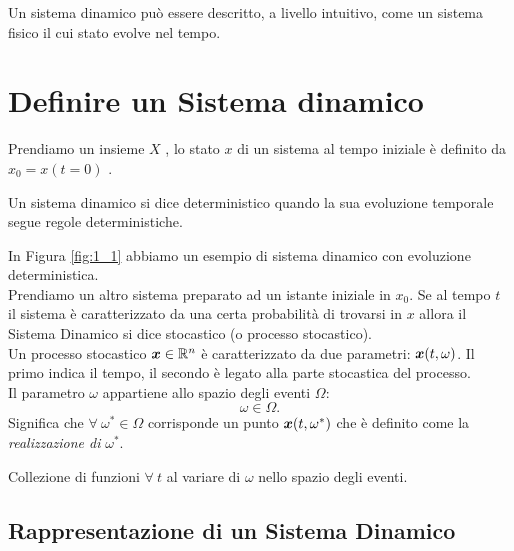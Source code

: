Un sistema dinamico può essere descritto, a livello intuitivo, come un sistema fisico il cui stato evolve nel tempo.
\section{Definire un Sistema dinamico}%
\label{sub:Sistema dinamico Deterministico e Stocastico.}
Prendiamo un insieme $X$ 
, lo stato $x$ di un sistema al tempo iniziale è definito da $x_0 = x(t=0)$
\leavevmode{}.
\begin{defn}
    Un sistema dinamico si dice deterministico quando la sua evoluzione temporale segue regole deterministiche.
\end{defn}
\noindent
In Figura \ref{fig:1_1} abbiamo un esempio di sistema dinamico con evoluzione deterministica.\\
Prendiamo un altro sistema preparato ad un istante iniziale in $x_0$. Se al tempo $t$ il sistema è caratterizzato da una certa probabilità di trovarsi in $x$ 
allora il Sistema Dinamico si dice stocastico (o processo stocastico).\\
Un processo stocastico $\boldsymbol{x} \in \mathbb{R}^n$ è caratterizzato da due parametri: $\boldsymbol{x} (t, \omega)$. Il primo indica il tempo, il secondo è legato alla parte stocastica del processo. \\
Il parametro $\omega$ appartiene allo spazio degli eventi $\Omega$:
\[
    \omega  \in \Omega
.\] 
Significa che $ \forall \ \omega^* \in \Omega$ corrisponde un punto $\boldsymbol{x} (t, \omega^*)$ che è definito come la \textit{realizzazione di }$\omega^*$.
\begin{defn}
    Collezione di funzioni $\forall \ t$ al variare di $\omega$ nello spazio degli eventi.
\end{defn}
\noindent
\subsection{Rappresentazione di un Sistema Dinamico}%
\label{sub:Rappresentazione di un Sistema Dinamico}
